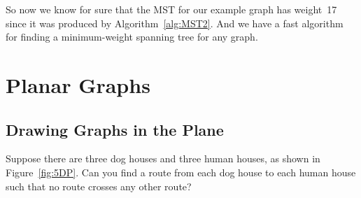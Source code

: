 So now we know for sure that the MST for our example graph has
weight~17 since it was produced by Algorithm~\ref{alg:MST2}.  And we
have a fast algorithm for finding a minimum-weight spanning tree for
any graph.

\begin{problems}
\classproblems
{}

\homeworkproblems
{}
\end{problems}


\begin{problems}
\classproblems
{}


\homeworkproblems
{}

\examproblems
{}

\end{problems}


\begin{problems}
\classproblems
{}

\examproblems
{}

\homeworkproblems
{}
\end{problems}

\section{Planar Graphs}\label{planar_graphs_sec}

\subsection{Drawing Graphs in the Plane}

Suppose there are three dog houses and three human houses, as shown in
Figure~\ref{fig:5DP}.  Can you find a route from each dog house to
each human house such that no route crosses any other route?

